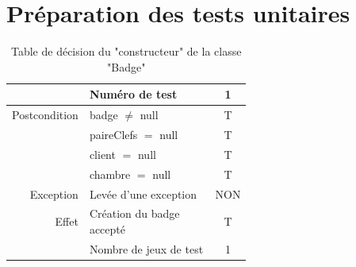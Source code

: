 \documentclass[11pt,article]{article}
\newcommand{\nullvalue}{\textsf{null}\xspace}
\begin{document}
\newpage

\section{Préparation des tests unitaires}


    \begin{table}[htbp!]
        \begin{tabular}{r|p{0.6\linewidth}|c|}
            \cline{2-3}

                &Numéro de test
                &1\\
            \hline
            \hline

            Postcondition
                &badge $\neq$ \nullvalue
                &T\\
            \cline{2-3}
                &paireClefs $=$ \nullvalue
                &T\\
            \cline{2-3}
                &client $=$ \nullvalue
                &T\\
            \cline{2-3}
                &chambre $=$ \nullvalue
                &T\\
            \cline{2-3}
            Exception
                &Levée d'une exception
                &NON\\
            \hline
            \hline
            Effet
                &Création du badge accepté
                &T\\
            \hline
            \hline
                &Nombre de jeux de test
                &1\\
            \cline{2-3}
        \end{tabular}
        \caption{Table de décision du "constructeur" de la classe "Badge"}
    \end{table}
\end{document}
